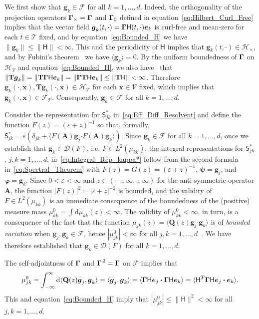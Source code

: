 \documentclass[leqno,onefignum,onetabnum]{siamltex1213}
\renewcommand{\d}{\mathrm{d}}
\newcommand{\Tb}{\mathbf{T}}
\newcommand{\Ab}{\mathbf{A}}
\newcommand{\Qb}{\mathbf{Q}}
\newcommand{\Tc}{\mathcal{T}}
\newcommand{\Vc}{\mathcal{V}}
\newcommand{\Hc}{\mathcal{H}}
\newcommand{\Fc}{\mathcal{F}}
\newcommand{\Hm}{\mathsf{H}}
\newcommand{\Sm}{\mathsf{S}}
\newcommand{\Ds}{\mathscr{D}}
\newcommand\bGamma{\mbox{\boldmath${\Gamma}$}}
\providecommand\bcdot{\boldsymbol{\cdot}}
\newcommand{\vecg}{\boldsymbol{g}}
\newcommand{\vecx}{\boldsymbol{x}}
\newcommand{\vece}{\boldsymbol{e}}
\newcommand{\vecpsi}{\boldsymbol{\psi}}
\newcommand{\vecvarphi}{\boldsymbol{\varphi}}
\begin{document}
We first show that $\vecg_k\in\Fc$ for
all $k=1,\ldots,d$. Indeed, the orthogonality of the
projection operators $\bGamma_\times=\bGamma$ and $\bGamma_0$ defined in
equation~\eqref{eq:Hilbert_Curl_Free} implies that the vector field
$\vecg_k(t,\cdot)=\bGamma\Hm(t,\cdot)\vece _k$ is curl-free and mean-zero
for each $t\in\Tc$ fixed, and by equation~\eqref{eq:Bounded_H} 
we have $\|\vecg_k\|\leq\|\Hm\|<\infty$. This and the periodicity of $\Hm$ implies
that $\vecg_k(t,\cdot)\in\Hc_\times$, and by Fubini's theorem~\cite{Folland:99:RealAnalysis}
we have $\langle\vecg_k\rangle=0$.  By the uniform boundedness of $\bGamma$ on
$\Hc_{\Vc}$ and equation~\eqref{eq:Bounded_H}, we also
have~\cite{Folland:99:RealAnalysis} that 
$\|\Tb\vecg_k\|=\|\Tb\bGamma\Hm\vece _k\|=\|\bGamma\Tb\Hm\vece _k\|\leq\|\Tb\Hm\|<\infty$.   
Therefore $\vecg_k(\cdot,\vecx),\Tb\vecg_k(\cdot,\vecx)\in\Hc_{\Tc}$ for each
$\vecx\in\Vc$ fixed, which implies that
$\vecg_k(\cdot,\vecx)\in\Fc_{\Tc}$. Consequently,  $\vecg_k\in\Fc$ for
all $k=1,\ldots,d$.



Consider the representation for $\Sm^*_{jk}$
in~\eqref{eq:Eff_Diff_Resolvent} and define the function 
$F(z)=(\varepsilon+z)^{-1}$ so that, formally,
$\Sm^*_{jk}=\varepsilon(\delta_{jk}+\langle F(\Ab)\vecg_j\bcdot F(\Ab)\vecg_k\rangle)$. Since
$\vecg_k\in\Fc$ for all $k=1,\ldots,d$, once we establish that
$\vecg_k\in\Ds(F)$, i.e. $F\in L^2(\mu_{kk})$, the integral representations
for $\Sm^*_{jk}$, $j,k=1,\ldots,d$, in~\eqref{eq:Integral_Rep_kappa*} follow
from the second formula in~\eqref{eq:Spectral_Theorem} with
$F(z)=G(z)=(\varepsilon+z)^{-1}$, $\vecpsi=\vecg_j$, and
$\vecvarphi=\vecg_k$. Since $0<\varepsilon<\infty$ and 
$z\in(-\imath\infty,\imath\infty)$ for the anti-symmetric operator $\Ab$, the function
$|F(z)|^2=|\varepsilon+z|^{-2}$ is bounded, and the validity of $F\in L^2(\mu_{kk})$ is
an immediate consequence of the boundedness of the (positive) measure
mass $\mu^0_{kk}=\int\d\mu_{kk}(z)<\infty$. The validity of $\mu^0_{kk}<\infty$, in turn,
is a consequence of the fact that the function
$\mu_{jk}(z)=\langle\Qb(z)\vecg_j\bcdot\vecg_k\rangle$ is of \emph{bounded
  variation} when $\vecg_j,\vecg_k\in\Fc$, hence
$|\mu^0_{jk}|<\infty$ for all $j,k=1,\ldots,d$~\cite{Stone:64}. We have therefore
established that $\vecg_k\in\Ds(F)$ for all $k=1,\ldots,d$.     




The self-adjointness of $\bGamma$
and $\bGamma^{\,2}=\bGamma$ on $\Fc$ implies that   
%
\begin{align}\label{eq:Mass}
  \mu^0_{jk}%
        =\int_{-\infty}^\infty\d\langle\Qb(z)\vecg_j,\vecg_k\rangle
        =\langle\vecg_j,\vecg_k\rangle
        =\langle\bGamma\Hm\vece _j\bcdot\bGamma\Hm\vece _k\rangle 
        =\langle\Hm^T\bGamma\Hm\vece _j\bcdot\vece _k\rangle.     
\end{align}
%
This and equation~\eqref{eq:Bounded_H} imply that
$|\mu^0_{jk}|\leq\|\Hm\|^2<\infty$ for all $j,k=1,\ldots,d$.  
\end{document}
